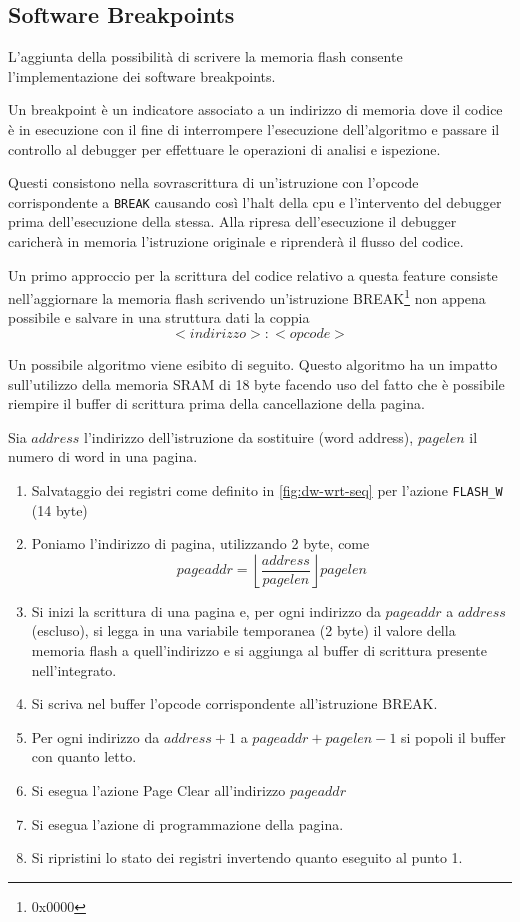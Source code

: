 \subsection{Software Breakpoints}

L'aggiunta della possibilità di scrivere la memoria flash consente l'implementazione dei software breakpoints.

Un breakpoint è un indicatore associato a un indirizzo di memoria dove il codice è in esecuzione con il fine di interrompere l'esecuzione dell'algoritmo e passare il controllo al debugger per effettuare le operazioni di analisi e ispezione.

Questi consistono nella sovrascrittura di un'istruzione con l'opcode corrispondente a \texttt{BREAK} causando così l'halt della cpu e l'intervento del debugger prima dell'esecuzione della stessa.
Alla ripresa dell'esecuzione il debugger caricherà in memoria l'istruzione originale e riprenderà il flusso del codice.

Un primo approccio per la scrittura del codice relativo a questa feature consiste nell'aggiornare la memoria flash scrivendo un'istruzione BREAK\footnote{0x0000} non appena possibile e salvare in una struttura dati la coppia \[<indirizzo>:<opcode>\]

Un possibile algoritmo viene esibito di seguito. Questo algoritmo ha un impatto sull'utilizzo della memoria SRAM di 18 byte facendo uso del fatto che è possibile riempire il buffer di scrittura prima della cancellazione della pagina.

Sia \(address\) l'indirizzo dell'istruzione da sostituire (word address), \(pagelen\) il numero di word in una pagina.

\begin{enumerate}
    \item Salvataggio dei registri come definito in \cref{fig:dw-wrt-seq} per l'azione \texttt{FLASH\_W} (14 byte)
    \item Poniamo l'indirizzo di pagina, utilizzando 2 byte, come \[pageaddr = \left\lfloor\frac{address}{pagelen}\right\rfloor pagelen\] 
    \item Si inizi la scrittura di una pagina e, per ogni indirizzo da \(pageaddr\) a \(address\) (escluso), si legga in una variabile temporanea (2 byte) il valore della memoria flash a quell'indirizzo e si aggiunga al buffer di scrittura presente nell'integrato.
    \item Si scriva nel buffer l'opcode corrispondente all'istruzione BREAK.\@ 
    \item Per ogni indirizzo da \(address + 1\) a \(pageaddr + pagelen - 1\) si popoli il buffer con quanto letto. 
    \item Si esegua l'azione Page Clear all'indirizzo \(pageaddr\)
    \item Si esegua l'azione di programmazione della pagina.
    \item Si ripristini lo stato dei registri invertendo quanto eseguito al punto 1.
\end{enumerate}

